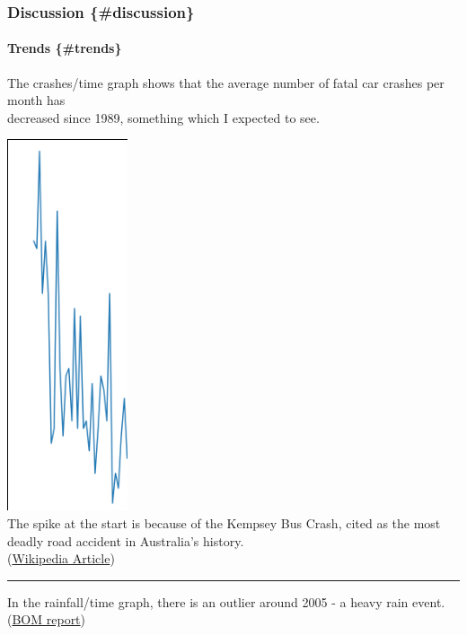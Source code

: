 \documentclass{article}
\begin{document}
\subsubsection{Discussion \{\#discussion\}}\label{discussion-discussion}

\paragraph{Trends \{\#trends\}}\label{trends-trends}

The crashes/time graph shows that the average number of fatal car
crashes per month has\\
decreased since 1989, something which I expected to see.

\href{assets/crashes_over_time_zoom.png}{\includegraphics{assets/crashes_over_time_zoom.png}}\\
The spike at the start is because of the Kempsey Bus Crash, cited as the
most\\
deadly road accident in Australia's history.\\
(\href{https://en.wikipedia.org/wiki/Kempsey_bus_crash}{Wikipedia
Article})

\begin{center}\rule{0.5\linewidth}{\linethickness}\end{center}

In the rainfall/time graph, there is an outlier around 2005 - a heavy
rain event.\\
(\href{https://bom.gov.au/climate/annual_sum/2005/page13-15.pdf}{BOM
report})
\end{document}
